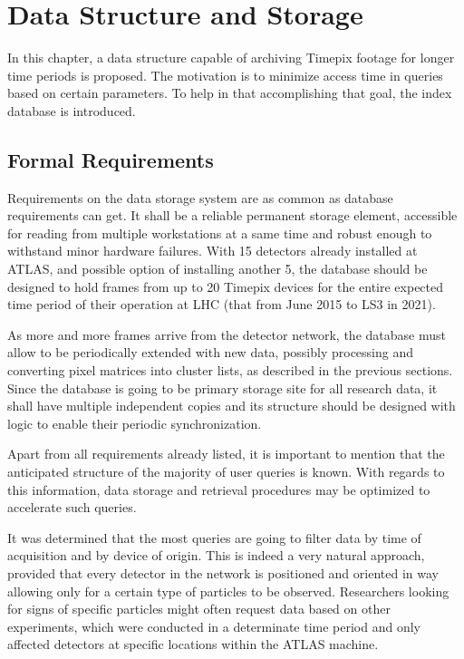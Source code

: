 \chapter{Data Structure and Storage}
In this chapter, a data structure capable of archiving Timepix footage for longer time periods is proposed. The motivation is to minimize access time in queries based on certain parameters. To help in that accomplishing that goal, the index database is introduced.

\section{Formal Requirements}
Requirements on the data storage system are as common as database requirements can get. It shall be a reliable permanent storage element, accessible for reading from multiple workstations at a same time and robust enough to withstand minor hardware failures. With 15 detectors already installed at ATLAS, and possible option of installing another 5, the database should be designed to hold frames from up to 20 Timepix devices for the entire expected time period of their operation at LHC (that from June 2015 to LS3 in 2021).

\todo

As more and more frames arrive from the detector network, the database must allow to be periodically extended with new data, possibly processing and converting pixel matrices into cluster lists, as described in the previous sections. Since the database is going to be primary storage site for all research data, it shall have multiple independent copies and its structure should be designed with logic to enable their periodic synchronization.

Apart from all requirements already listed, it is important to mention that the anticipated structure of the majority of user queries is known. With regards to this information, data storage and retrieval procedures may be optimized to accelerate such queries.

It was determined that the most queries are going to filter data by time of acquisition and by device of origin. This is indeed a very natural approach, provided that every detector in the network is positioned and oriented in way allowing only for a certain type of particles to be observed. Researchers looking for signs of specific particles might often request data based on other experiments, which were conducted in a determinate time period and only affected detectors at specific locations within the ATLAS machine.

